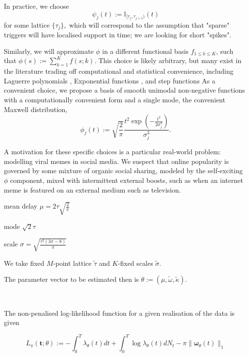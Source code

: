 \documentclass[11pt]{article}
\begin{document}
In practice, we choose
\[\psi_j(t) := \mathbb{I}_{[\tau_{j},\tau_{j+1})}(t)\] for some lattice
$\{\tau_j\},$ which will correspond to the assumption that "sparse"
triggers will have localised support in time; we are looking for short
"spikes".

Similarly, we will approximate $\phi$ in a different functional basis
${f}_{1\leq k \leq K}$, such that $\phi(s):= \sum_{k=1}^K f(s;k)$. This
choice is likely arbitrary, but many exist in the literature trading off
computational and statistical convenience, including Laguerre
polynomials \cite{ogata_linear_1982}, Exponential functions
\cite{schoenberg_consistent_2005,rambaldi_modeling_2015}, and step
functions \cite{eichler_graphical_2016} As a convenient choice, we
propose a basis of smooth unimodal non-negative functions with a
computationally convenient form and a single mode, the convenient
Maxwell distribution,
\[\phi_j(t):=\sqrt{\frac{2}{\pi}} \frac{t^2\exp\left(-\frac{t^2}{2\sigma_j^2}\right)}{\sigma_j^3}.\]

A motivation for these specific choices is a particular real-world
problem: modelling viral memes in social media. We suspect that online
popularity is governed by some mixture of organic social sharing,
modeled by the self-exciting $\phi$ component, mixed with intermittent
external boosts, such as when an internet meme is featured on an
external medium such as television.

    mean delay $\mu=2\tau \sqrt{\frac{2}{\pi}}$

mode $\sqrt{2}\tau$

scale $\sigma=\sqrt{\frac{\tau^2(3 \pi - 8)}{\pi}}$

We take fixed $M$-point lattice $\tilde{\tau}$ and $K$-fixed scales
$\tilde{\sigma}.$

The parameter vector to be estimated then is
$\theta:=(\mu, \tilde{\omega}, \tilde{\kappa}).$



    \begin{center}
    \end{center}
    { \hspace*{\fill} \\}
    
    The non-penalised log-likelihood function for a given realisation of the
data is given \cite{ozaki_etimating_1979}

\[L_\pi(\mathbf t;\theta):=-\int_0^T\lambda_\theta(t)dt + \int_0^T\log \lambda_\theta(t) dN_t - \pi\|\boldsymbol \omega_\theta(t)\|_1\]
\end{document}
